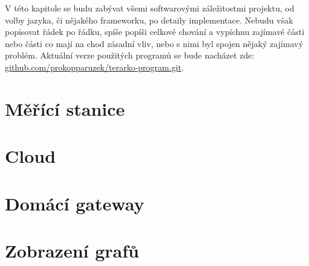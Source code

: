 V této kapitole se budu zabývat všemi softwarovými záležitostmi projektu, od volby jazyka, či nějakého frameworku, po 
detaily implementace. Nebudu však popisovat řádek po řádku, spíše popíši celkové chování a vypíchnu zajímavé části nebo 
části co mají na chod zásadní vliv, nebo s nimi byl spojen nějaký zajímavý problém. Aktuální verze použitých programů se 
bude nacházet zde: 
\href{https://github.com/prokopparuzek/terarko-program.git}{github.com/prokopparuzek/terarko-program.git}.
\section{Měřící stanice}

\section{Cloud}
\section{Domácí gateway}

\section{Zobrazení grafů}
